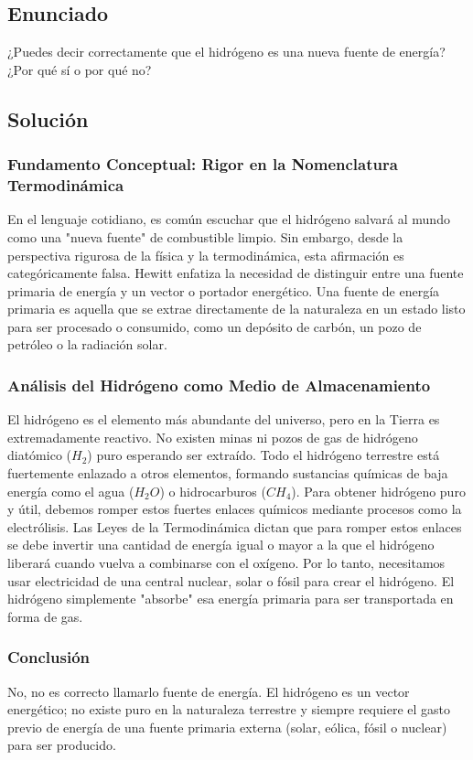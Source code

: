 \documentclass[12pt,a4paper]{article}
\begin{document}
\newpage
\subsection*{Enunciado}
¿Puedes decir correctamente que el hidrógeno es una nueva fuente de energía? ¿Por qué sí o por qué no?

\subsection*{Solución}

\subsubsection*{Fundamento Conceptual: Rigor en la Nomenclatura Termodinámica}
En el lenguaje cotidiano, es común escuchar que el hidrógeno salvará al mundo como una "nueva fuente" de combustible limpio. Sin embargo, desde la perspectiva rigurosa de la física y la termodinámica, esta afirmación es categóricamente falsa. Hewitt enfatiza la necesidad de distinguir entre una fuente primaria de energía y un vector o portador energético. Una fuente de energía primaria es aquella que se extrae directamente de la naturaleza en un estado listo para ser procesado o consumido, como un depósito de carbón, un pozo de petróleo o la radiación solar.

\subsubsection*{Análisis del Hidrógeno como Medio de Almacenamiento}
El hidrógeno es el elemento más abundante del universo, pero en la Tierra es extremadamente reactivo. No existen minas ni pozos de gas de hidrógeno diatómico ($H_2$) puro esperando ser extraído. Todo el hidrógeno terrestre está fuertemente enlazado a otros elementos, formando sustancias químicas de baja energía como el agua ($H_2O$) o hidrocarburos ($CH_4$). 
Para obtener hidrógeno puro y útil, debemos romper estos fuertes enlaces químicos mediante procesos como la electrólisis. Las Leyes de la Termodinámica dictan que para romper estos enlaces se debe invertir una cantidad de energía igual o mayor a la que el hidrógeno liberará cuando vuelva a combinarse con el oxígeno. Por lo tanto, necesitamos usar electricidad de una central nuclear, solar o fósil para crear el hidrógeno. El hidrógeno simplemente "absorbe" esa energía primaria para ser transportada en forma de gas.

\subsubsection*{Conclusión}
No, no es correcto llamarlo fuente de energía. El hidrógeno es un vector energético; no existe puro en la naturaleza terrestre y siempre requiere el gasto previo de energía de una fuente primaria externa (solar, eólica, fósil o nuclear) para ser producido.
\end{document}
